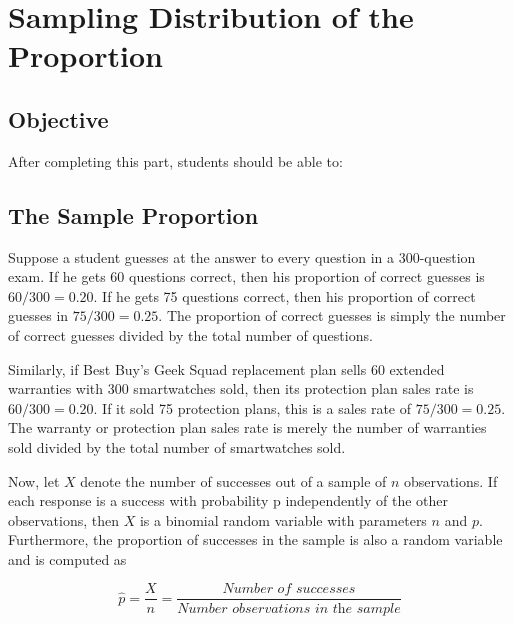 \documentclass[11pt, chapterprefix=true]{scrbook}\usepackage[]{graphicx}\usepackage[]{color}
\begin{document}
\onecolumn




\chapter{Sampling Distribution of the Proportion}
\label{chap:ch8}

\section{Objective}

After completing this part, students should be able to:


\section{The Sample Proportion}

Suppose a student guesses at the answer to every question in a 300-question exam.  If he gets 60 questions correct, then his proportion of correct guesses is $60/300 = 0.20$.  If he gets 75 questions correct, then his proportion of correct guesses in $75/300 = 0.25$.  The proportion of correct guesses is simply the number of correct guesses divided by the total number of questions.

Similarly, if Best Buy's Geek Squad replacement plan sells 60 extended warranties with 300 smartwatches sold, then its protection plan sales rate is $60/300 = 0.20$. If it sold 75 protection plans, this is a sales rate of $75/300 = 0.25$.  The warranty or protection plan sales rate is merely the number of warranties sold divided by the total number of smartwatches sold.

Now, let $X$ denote the number of successes out of a sample of $n$ observations. If each response is a success with probability p independently of the other observations, then $X$ is a binomial random variable with parameters $n$ and $p$.  Furthermore, the proportion of successes in the sample is also a random variable and is computed as

\begin{equation*}
  \hat{p} = \frac{X}{n} = \frac{\textit{Number of successes}}{\textit{Number observations in the sample}}
\end{equation*}
\end{document}

